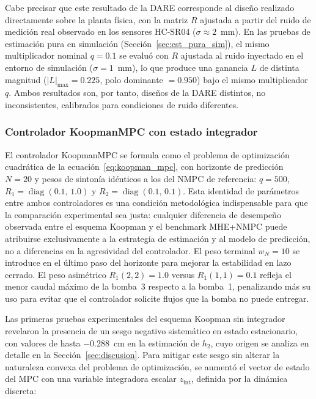 \documentclass[12pt,letterpaper]{article}
\begin{document}
Cabe precisar que este resultado de la DARE corresponde al diseño
realizado directamente sobre la planta física, con la matriz $R$
ajustada a partir del ruido de medición real observado en los
sensores HC-SR04 ($\sigma \approx 2$~mm). En las pruebas de
estimación pura en simulación (Sección~\ref{sec:est_pura_sim}),
el mismo multiplicador nominal $q = 0.1$ se evaluó con $R$ ajustada
al ruido inyectado en el entorno de simulación ($\sigma = 1$~mm),
lo que produce una ganancia $L$ de distinta magnitud
($|L|_{\max} = 0.225$, polo dominante $= 0.950$) bajo el mismo
multiplicador $q$. Ambos resultados son, por tanto, diseños de
la DARE distintos, no inconsistentes, calibrados para
condiciones de ruido diferentes.

\subsubsection{Controlador KoopmanMPC con estado integrador}
\label{sec:koopmanmpc_v4}

El controlador KoopmanMPC se formula como el problema de optimización 
cuadrática de la ecuación~\eqref{eq:koopman_mpc}, con horizonte de 
predicción $N = 20$ y pesos de sintonía idénticos a los del NMPC de 
referencia: $q = 500$, $R_1 = \operatorname{diag}(0.1,\, 1.0)$ y $R_2 = 
\operatorname{diag}(0.1,\, 0.1)$. Esta identidad de parámetros entre 
ambos controladores es una condición metodológica indispensable para que 
la comparación experimental sea justa: cualquier diferencia de desempeño 
observada entre el esquema Koopman y el benchmark MHE+NMPC puede 
atribuirse exclusivamente a la estrategia de estimación y al modelo de 
predicción, no a diferencias en la agresividad del controlador. El peso 
terminal $w_N = 10$ se introduce en el último paso del horizonte para 
mejorar la estabilidad en lazo cerrado. El peso asimétrico $R_1(2,2) = 
1.0$ versus $R_1(1,1) = 0.1$ refleja el menor caudal máximo de la 
bomba~3 respecto a la bomba~1, penalizando más su uso para evitar que el 
controlador solicite flujos que la bomba no puede entregar.

Las primeras pruebas experimentales del esquema Koopman sin integrador 
revelaron la presencia de un sesgo negativo sistemático en estado 
estacionario, con valores de hasta $-0.288$~cm en la estimación de $h_2$, 
cuyo origen se analiza en detalle en la Sección~\ref{sec:discusion}. Para 
mitigar este sesgo sin alterar la naturaleza convexa del problema de 
optimización, se aumentó el vector de estado del MPC con una variable 
integradora escalar $z_{\mathrm{int}}$, definida por la dinámica discreta:
\end{document}
